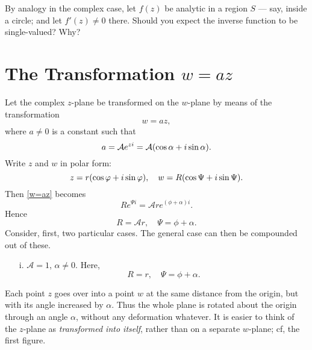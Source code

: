 \documentclass[twosided]{memoir}
\begin{document}
By analogy in the complex case, let $f(z)$ be analytic in a region $S$ --- say, inside a circle; and let $f'(z)\neq 0$ there. Should you expect the inverse function to be single-valued? Why?


\section{The Transformation $w=az$}

Let the complex $z$-plane be transformed on the $w$-plane by means of the transformation
\begin{equation}\label{w=az}
w=az,
\end{equation}
where $a\neq 0$ is a constant such that
\[
	a=\mathcal{A}e^{zi}=\mathcal{A}\pbr*{\cos \alpha +i\sin \alpha } 
.\] Write $z$ and $w$ in polar form:
\[
	z=r\pbr*{\cos \phi +i\sin \phi } , \quad w=R\pbr*{\cos \Psi+i\sin \Psi} 
.\] Then \ref{w=az} becomes
\begin{equation}\label{Rephi}
	Re^{\Psi i}=\mathcal{A}r e ^{(\phi +\alpha )i}.
\end{equation}
Hence
\begin{equation}\label{R=Ar}
	R=\mathcal{A}r, \quad \Psi=\phi +\alpha.
\end{equation}
Consider, first, two particular cases. The general case can then be compounded out of these. 

\begin{enumerate}
	\item[i.] $\mathcal{A}=1$, $\alpha \neq 0$. Here,
		\[
		R=r, \quad \Psi=\phi +\alpha 
		.\]
\end{enumerate}
Each point $z$ goes over into a point $w$ at the same distance from the origin, but with its angle increased by $\alpha $. Thus the whole plane is rotated about the origin through an angle $\alpha $, without any deformation whatever. It is easier to think of the $z$-plane as \emph{transformed into itself}, rather than on a separate $w$-plane; cf, the first figure.

\begin{figure}[htbp]
\centering
{}
\end{figure}
\end{document}
